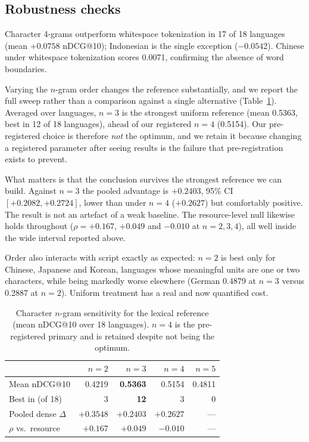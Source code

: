 \documentclass{ijimai_article}
\begin{document}
\subsection{Robustness checks}
Character 4-grams outperform whitespace tokenization in 17 of 18 languages (mean
$+0.0758$ nDCG@10); Indonesian is the single exception ($-0.0542$). Chinese under
whitespace tokenization scores 0.0071, confirming the absence of word boundaries.

Varying the $n$-gram order changes the reference substantially, and we report the full
sweep rather than a comparison against a single alternative
(Table~\ref{tab:ngram}). Averaged over languages, $n{=}3$ is the strongest uniform
reference (mean 0.5363, best in 12 of 18 languages), ahead of our registered $n{=}4$
(0.5154). Our pre-registered choice is therefore \emph{not} the optimum, and we retain
it because changing a registered parameter after seeing results is the failure that
pre-registration exists to prevent.

What matters is that the conclusion survives the strongest reference we can build.
Against $n{=}3$ the pooled advantage is $+0.2403$, 95\% CI $[+0.2082, +0.2724]$, lower
than under $n{=}4$ ($+0.2627$) but comfortably positive. The result is not an artefact
of a weak baseline. The resource-level null likewise holds throughout
($\rho = +0.167$, $+0.049$ and $-0.010$ at $n = 2, 3, 4$), all well inside the wide
interval reported above.

Order also interacts with script exactly as expected: $n{=}2$ is best only for Chinese,
Japanese and Korean, languages whose meaningful units are one or two characters, while
being markedly worse elsewhere (German 0.4879 at $n{=}3$ versus 0.2887 at $n{=}2$).
Uniform treatment has a real and now quantified cost.

\begin{table}[t]
\caption{Character $n$-gram sensitivity for the lexical reference (mean nDCG@10 over 18
languages). $n{=}4$ is the pre-registered primary and is retained despite not being the
optimum.}
\label{tab:ngram}
\centering
\small
\begin{tabular}{lrrrr}
\toprule
 & $n{=}2$ & $n{=}3$ & $n{=}4$ & $n{=}5$ \\
\midrule
Mean nDCG@10 & 0.4219 & \textbf{0.5363} & 0.5154 & 0.4811 \\
Best in (of 18) & 3 & \textbf{12} & 3 & 0 \\
Pooled dense $\Delta$ & $+0.3548$ & $+0.2403$ & $+0.2627$ & --- \\
$\rho$ vs.\ resource & $+0.167$ & $+0.049$ & $-0.010$ & --- \\
\bottomrule
\end{tabular}
\end{table}
\end{document}
